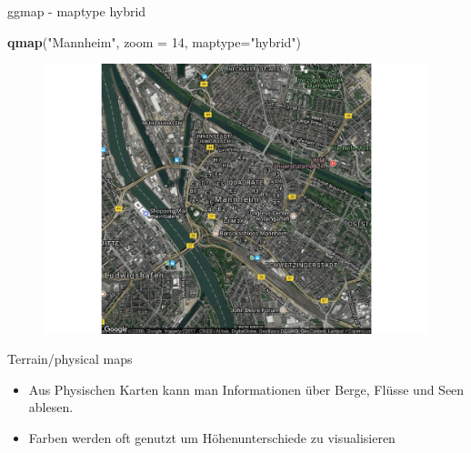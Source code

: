 \documentclass[ignorenonframetext,]{beamer}
\newenvironment{Shaded}{}{}
\newcommand{\KeywordTok}[1]{\textcolor[rgb]{0.00,0.44,0.13}{\textbf{{#1}}}}
\newcommand{\DataTypeTok}[1]{\textcolor[rgb]{0.56,0.13,0.00}{{#1}}}
\newcommand{\DecValTok}[1]{\textcolor[rgb]{0.25,0.63,0.44}{{#1}}}
\newcommand{\StringTok}[1]{\textcolor[rgb]{0.25,0.44,0.63}{{#1}}}
\newcommand{\NormalTok}[1]{{#1}}
\begin{document}
\begin{frame}[fragile]{ggmap - maptype hybrid}

\begin{Shaded}
\begin{Highlighting}[]
\KeywordTok{qmap}\NormalTok{(}\StringTok{"Mannheim"}\NormalTok{, }\DataTypeTok{zoom =} \DecValTok{14}\NormalTok{, }\DataTypeTok{maptype=}\StringTok{"hybrid"}\NormalTok{)}
\end{Highlighting}
\end{Shaded}

\begin{figure}[htbp]
\centering
\includegraphics{RSocialScience2_files/figure-beamer/unnamed-chunk-39-1.pdf}
\caption{}
\end{figure}

\end{frame}

\begin{frame}{Terrain/physical maps}

\begin{itemize}
\item
  Aus Physischen Karten kann man Informationen über Berge, Flüsse und
  Seen ablesen.
\item
  Farben werden oft genutzt um Höhenunterschiede zu visualisieren
\end{itemize}

\end{frame}
\end{document}
